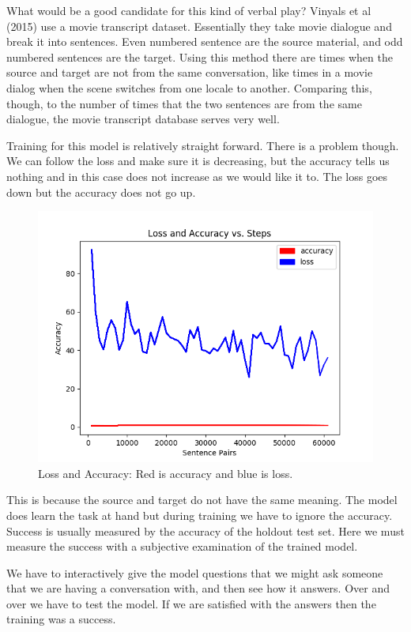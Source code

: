 What would be a good candidate for this kind of verbal play? Vinyals et al (2015)\cite{DBLP:journals/corr/VinyalsL15} use a movie transcript dataset. Essentially they take movie dialogue and break it into sentences. Even numbered sentence are the source material, and odd numbered sentences are the target. Using this method there are times when the source and target are not from the same conversation, like times in a movie dialog when the scene switches from one locale to another. Comparing this, though, to the number of times that the two sentences are from the same dialogue, the movie transcript database serves very well.

Training for this model is relatively straight forward. There is a problem though. We can follow the loss and make sure it is decreasing, but the accuracy tells us nothing and in this case does not increase as we would like it to. The loss goes down but the accuracy does not go up.

\begin{figure}[H]
	\begin{center}
	
	\includegraphics[scale=0.5]{Figure_1}
		
\end{center}
	\caption[Loss and Accuracy]{Loss and Accuracy: Red is accuracy and blue is loss.}
	
\end{figure}

This is because the source and target do not have the same meaning. The model does learn the task at hand but during training we have to ignore the accuracy. Success is usually measured by the accuracy of the holdout test set. Here we must measure the success with a subjective examination of the trained model.

We have to interactively give the model questions that we might ask someone that we are having a conversation with, and then see how it answers. Over and over we have to test the model. If we are satisfied with the answers then the training was a success.
